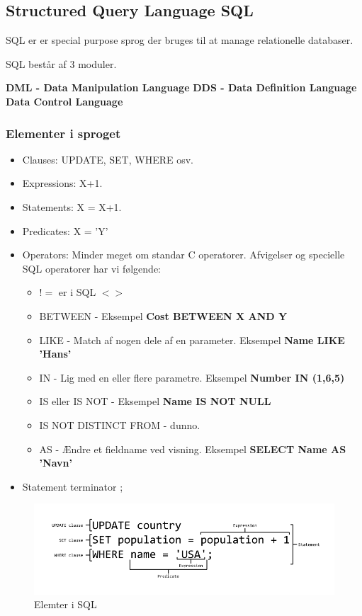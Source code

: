 \newpage

\subsection{Structured Query Language SQL}
SQL er er special purpose sprog der bruges til at manage relationelle databaser.

SQL består af 3 moduler.

\textbf{DML - Data Manipulation Language}
\textbf{DDS - Data Definition Language}
\textbf{Data Control Language}

\subsubsection{Elementer i sproget}

\begin{itemize}
	\item Clauses: UPDATE, SET, WHERE osv.
	\item Expressions: X+1.
	\item Statements: X = X+1.
	\item Predicates: X = 'Y'
	\item Operators: Minder meget om standar C operatorer. Afvigelser og specielle SQL operatorer har vi følgende:
	\begin{itemize}
		\item $!=$ er i SQL $<>$
		\item BETWEEN - Eksempel \textbf{Cost BETWEEN X AND Y}
		\item LIKE - Match af nogen dele af en parameter. Eksempel \textbf{Name LIKE 'Hans'}
		\item IN - Lig med en eller flere parametre. Eksempel \textbf{Number IN (1,6,5)}
		\item IS eller IS NOT - Eksempel \textbf{Name IS NOT NULL}
		\item IS NOT DISTINCT FROM - dunno.
		\item AS - Ændre et fieldname ved visning. Eksempel \textbf{SELECT Name AS 'Navn'}
	\end{itemize}
	\item Statement terminator ;
	
\end{itemize}

\begin{figure}
\centering
\includegraphics[width=0.9\linewidth]{figs/spm7/sqlDecomp}
\caption{Elemter i SQL}
\label{fig:sqlDecomp}
\end{figure}

